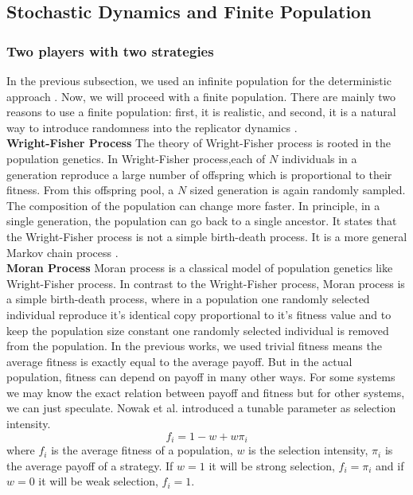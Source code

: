 \documentclass{article}
\begin{document}
\subsection{Stochastic Dynamics and Finite Population}
\subsubsection{Two players with two strategies}
In the previous subsection, we used an infinite population for the deterministic approach \citep{Hofbauer2003}.
Now, we will proceed with a finite population.
There are mainly two reasons to use a finite population: first, it is realistic, and second, it is a natural way to introduce randomness into the replicator dynamics \citep{Altrock2010}.\\
\textbf{Wright-Fisher Process}
\newline
The theory of Wright-Fisher process is rooted in the population genetics. In Wright-Fisher process,each of $N$ individuals in a generation reproduce a large number of offspring which is proportional to their fitness.
From this offspring pool, a $N$ sized generation is again randomly sampled. The composition of the population can change more faster. In principle, in a single generation, the population can go back to a single ancestor. 
It states that the Wright-Fisher process is not a simple birth-death process. It is a more general Markov chain process \citep{Imhof2006}.\\
\textbf{Moran Process}
\newline
Moran process is a classical model of population genetics like Wright-Fisher process. In contrast to the Wright-Fisher process, Moran process is a simple birth-death process, where in a population one randomly selected individual reproduce it's identical copy proportional to it's fitness value and to keep the population size constant one randomly selected individual is removed from the population.
In the previous works, we used trivial fitness means the average fitness is exactly equal to the average payoff. But in the actual population, fitness can depend on payoff in many other ways. For some systems we may know the exact relation between payoff and fitness but for other systems, we can just speculate.
Nowak et al.\citep{Nowak2004} introduced a tunable parameter as selection intensity. 
\begin{equation}
f_i=1-w+w\pi_i \label{eq:11}
\end{equation}
where $f_i$ is the average fitness of a population, $w$ is the selection intensity, $\pi_i$ is the average payoff of a strategy. If $w=1$ it will be strong selection, $f_i=\pi_i$ and if $w=0$ it will be weak selection, $f_i=1$.\\
\end{document}
